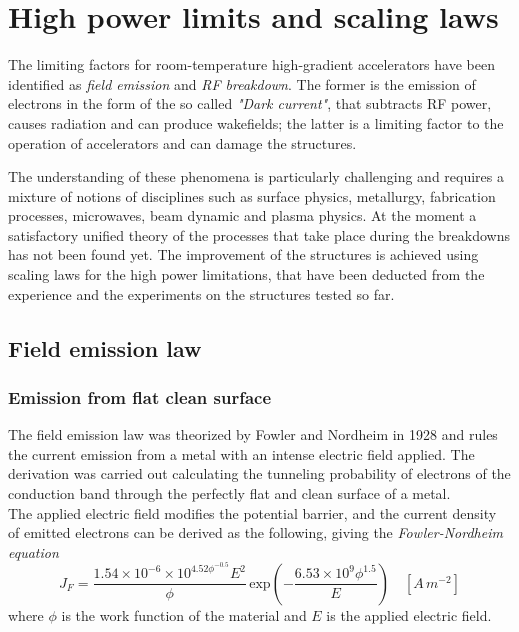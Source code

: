 \section[High power limits and scaling laws]{High power limits and scaling laws}

The limiting factors for room-temperature high-gradient accelerators have been identified as \textit{field emission} and \textit{RF breakdown}. The former is the emission of electrons in the form of the so called \textit{"Dark current"}, that subtracts RF power, causes radiation and can produce wakefields; the latter is a limiting factor to the operation of accelerators and can damage the structures.\cite{Wang:1997ip}

The understanding of these phenomena is particularly challenging and requires a mixture of notions of disciplines such as surface physics, metallurgy, fabrication processes, microwaves, beam dynamic and plasma physics. At the moment a satisfactory unified theory of the processes that take place during the breakdowns has not been found yet. The improvement of the structures is achieved using scaling laws for the high power limitations, that have been deducted from the experience and the experiments on the structures tested so far. 


\subsection[Field emission law]{Field emission law}

\subsubsection{Emission from flat clean surface}

The field emission law was theorized by Fowler and Nordheim in 1928 and rules the current emission from a metal with an intense electric field applied. The derivation was carried out calculating the tunneling probability of electrons of the conduction band through the perfectly flat and clean surface of a metal. \\The applied electric field modifies the potential barrier, and the current density of emitted electrons can be derived as the following, giving the  \textit{Fowler-Nordheim equation} \cite{Fowler173}
\begin{equation}
J_F = \frac{ 1.54\times10^{-6} \times 10^{4.52\phi^{-0.5}} E^2}{  \phi } \, \text{exp} \left ( -\frac{6.53\times 10^9 \phi^{1.5}}{E} \right ) \quad [A\,m^{-2}]  \label{FNlaw}
\end{equation}
where $\phi$ is the work function of the material and $E$ is the applied electric field.


